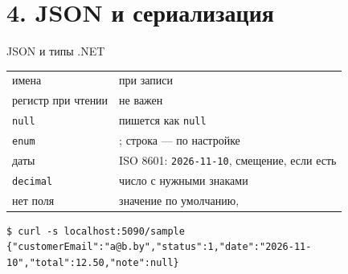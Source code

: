 \documentclass[aspectratio=169,10pt,t]{beamer}
\newcommand{\termsm}{\ttfamily\fontsize{6.6}{7.9}\selectfont}
\begin{document}
\section{4. JSON и сериализация}

\begin{frame}[plain]
\end{frame}

\begin{frame}[plain]
\end{frame}

\begin{frame}[fragile]{JSON и типы .NET}
  \slidetop
  {\renewcommand{\arraystretch}{1.2}\small
  \begin{tabular}{@{}L{4.0cm}L{8.8cm}@{}}
    имена                 &  при записи \\
    регистр при чтении    & не важен \\
    \texttt{null}         & пишется как \texttt{null} \\
    \texttt{enum}         & ; строка --- по настройке \\
    даты                  & ISO 8601: \texttt{2026-11-10}, смещение, если есть \\
    \texttt{decimal}      & число с нужными знаками \\
    нет поля              & значение по умолчанию,  \\
  \end{tabular}}

  \slidegap
\begin{lstlisting}[style=term,basicstyle=\termsm]
$ curl -s localhost:5090/sample
{"customerEmail":"a@b.by","status":1,"date":"2026-11-10","total":12.50,"note":null}
\end{lstlisting}

\end{frame}
\end{document}
